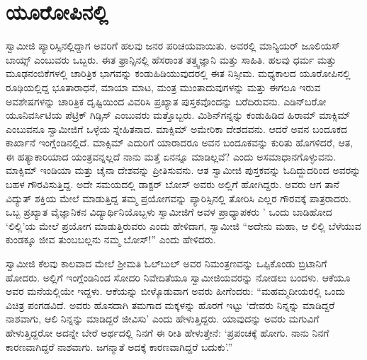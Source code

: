 
\chapter{ಯೂರೋಪಿನಲ್ಲಿ }

 ಸ್ವಾಮೀಜಿ ಪ್ಯಾರಿಸ್ಸಿನಲ್ಲಿದ್ದಾಗ ಅವರಿಗೆ ಹಲವು ಜನರ ಪರಿಚಯವಾಯಿತು. ಅವರಲ್ಲಿ ಮಾನ್ಯಿಯರ್ ಜೂಲಿಯಸ್ ಬಾಯ್ಸ್ ಎಂಬುವರು ಒಬ್ಬರು. ಈತ ಫ್ರಾನ್ಸಿನಲ್ಲಿ ಹೆಸರಾಂತ ತತ್ತ್ವಜ್ಞಾನಿ ಮತ್ತು ಸಾಹಿತಿ. ಹಲವು ಧರ್ಮ ಮತ್ತು ಮೂಢನಂಬಿಕೆಗಳಲ್ಲಿ ಚಾರಿತ್ರಿಕ ಭಾಗವನ್ನು ಕಂಡುಹಿಡಿಯುವುದರಲ್ಲಿ ಈತ ನಿಸ್ಸೀಮ. ಮಧ್ಯಕಾಲದ ಯೂರೋಪಿನಲ್ಲಿ ರೂಢಿಯಲ್ಲಿದ್ದ ಭೂತಾರಾಧನೆ, ಮಾಯಾ ಮಾಟ, ಮಂತ್ರ ಮುಂತಾದುವುಗಳನ್ನು ಮತ್ತು ಈಗಲೂ ಇರುವ ಅವಶೇಷಗಳನ್ನು ಚಾರಿತ್ರಿಕ ದೃಷ್ಟಿಯಿಂದ ವಿವರಿಸಿ ಪ್ರಖ್ಯಾತ ಪುಸ್ತಕವೊಂದನ್ನು ಬರೆದಿರುವನು. ಎಡಿನ್‍ಬರೋ ಯೂನಿವರ್ಸಿಟಿಯ ಪೆಟ್ರಿಕ್ ಗಿಡ್ಸಿಸ್ ಎಂಬುವರು ಮತ್ತೊಬ್ಬರು. ಮಿಶಿನ್‍ಗನ್ನನ್ನು ಕಂಡುಹಿಡಿದ ಹಿರಾಮ್ ಮಾಕ್ಸಿಮ್ ಎಂಬುವನೂ ಸ್ವಾಮೀಜಿಗೆ ಒಳ್ಳೆಯ ಸ್ನೇಹಿತನಾದ. ಮಾಕ್ಸಿಮ್ ಅಮೇರಿಕಾ ದೇಶದವನು. ಆದರೆ ಅವನ ಬಂದೂಕದ ಕಾರ್ಖಾನೆ ಇಂಗ್ಲೆಂಡಿನಲ್ಲಿದೆ. ಮಾಕ್ಸಿಮ್ ಎದುರಿಗೆ ಯಾರಾದರೂ ಅವನ ಬಂದೂಕವನ್ನು ಕುರಿತು ಹೊಗಳಿದರೆ, ಆತ, ಈ ಹತ್ಯಾಕಾರಿಯಾದ ಯಂತ್ರವನ್ನಲ್ಲದೆ ನಾನು ಮತ್ತೆ ಏನನ್ನೂ ಮಾಡಿಲ್ಲವೆ? ಎಂದು ಅಸಮಾಧಾನಗೊಳ್ಳುವನು. ಮಾಕ್ಸಿಮ್ ಇಂಡಿಯಾ ಮತ್ತು ಚೈನಾ ದೇಶವನ್ನು ಪ್ರೀತಿಸುವನು. ಆತ ಸ್ವಾಮೀಜಿ ಪುಸ್ತಕವನ್ನು ಓದಿದ್ದುದರಿಂದ ಅವರನ್ನು ಬಹಳ ಗೌರವಿಸುತ್ತಿದ್ದ. ಅದೇ ಸಮಯದಲ್ಲಿ ಡಾಕ್ಟರ್ ಬೋಸ್ ಅವರು ಅಲ್ಲಿಗೆ ಹೋಗಿದ್ದರು. ಅವರು ಆಗ ತಾನೆ ವಿದ್ಯುತ್ ಶಕ್ತಿಯ ಮೇಲೆ ಮಾಡುತ್ತಿದ್ದ ತಮ್ಮ ಪ್ರಯೋಗವನ್ನು ಪ್ಯಾರಿಸ್ಸಿನಲ್ಲಿ ತೋರಿಸಿ ಎಲ್ಲರ ಗೌರವಕ್ಕೆ ಪಾತ್ರರಾದರು. ಒಬ್ಬ ಪ್ರಖ್ಯಾತ ವೈಜ್ಞಾನಿಕನ ವಿದ್ಯಾರ್ಥಿನಿಯೊಬ್ಬಳು ಸ್ವಾಮೀಜಿಗೆ ಅವಳ ಪ್ರಾಧ್ಯಾಪಕರು ' ಒಂದು ಬಾಡಿಹೋದ ‘ಲಿಲ್ಲಿ’ಯ ಮೇಲೆ ಪ್ರಯೋಗ ಮಾಡುತ್ತಿರುವರು ಎಂದು ಹೇಳಿದಾಗ, ಸ್ವಾಮೀಜಿ “ಅದೇನು ಮಹಾ, ಆ ಲಿಲ್ಲಿ ಬೆಳೆಯುವ ಕುಂಡಕ್ಕೂ ಜೀವ ತುಂಬಬಲ್ಲನು ನಮ್ಮ ಬೋಸ್!” ಎಂದು ಹೇಳಿದರು.

 ಸ್ವಾಮೀಜಿ ಕೆಲವು ಕಾಲವಾದ ಮೇಲೆ ಶ‍್ರೀಮತಿ ಓಲ್‍ಬುಲ್ ಅವರ ನಿಮಂತ್ರಣವನ್ನು ಒಪ್ಪಿಕೊಂಡು ಬ್ರಿಟಾನಿಗೆ ಹೋದರು. ಅಲ್ಲಿಗೆ ಇಂಗ್ಲೆಂಡಿನಿಂದ ಸೋದರಿ ನಿವೇದಿತೆಯೂ ಸ್ವಾಮೀಜಿಯವರನ್ನು ನೋಡಲು ಬಂದಳು. ಆಕೆಯೂ ಅವರ ಮನೆಯಲ್ಲಿಯೇ ಇದ್ದಳು. ಆಕೆಯನ್ನು ಬೀಳ್ಕೊಡುವಾಗ ಅವರು ಹೀಗೆಂದರು: “ಮಹಮ್ಮದೀಯರಲ್ಲಿ ಒಂದು ವಿಚಿತ್ರ ಪಂಗಡವಿದೆ. ಅವರು ಹೊಸದಾಗಿ ತಮಗಾದ ಮಕ್ಕಳನ್ನು ಹೊರಗೆ ಇಟ್ಟು ‘ದೇವರು ನಿನ್ನನ್ನು ಮಾಡಿದ್ದರೆ ನಾಶವಾಗು, ಆಲಿ ನಿನ್ನನ್ನು ಮಾಡಿದ್ದರೆ ಜೀವಿಸು’ ಎಂದು ಹೇಳುತ್ತಿದ್ದರು. ಯಾವುದನ್ನು ಅವರು ಮಗುವಿಗೆ ಹೇಳುತ್ತಿದ್ದರೋ ಅದನ್ನೇ ಬೇರೆ ಅರ್ಥದಲ್ಲಿ ನಿನಗೆ ಈ ರೀತಿ ಹೇಳುತ್ತೇನೆ: ‘ಪ್ರಪಂಚಕ್ಕೆ ಹೋಗು. ನಾನು ನಿನಗೆ ಕಾರಣವಾಗಿದ್ದರೆ ನಾಶವಾಗು. ಜಗನ್ಮಾತೆ ಅದಕ್ಕೆ ಕಾರಣವಾಗಿದ್ದರೆ ಬದುಕು’.” 

